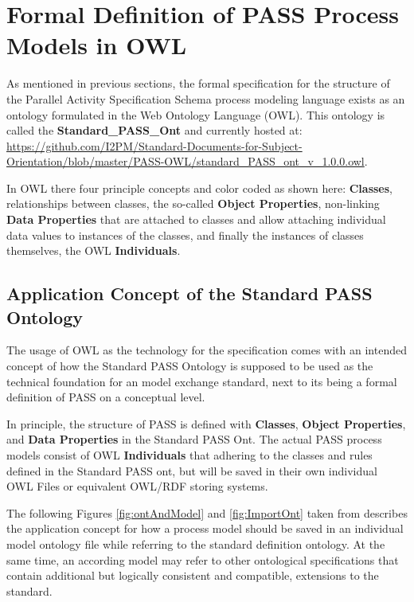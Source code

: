 \section{Formal Definition of PASS Process Models in OWL}
\label{sec:formalModelStrucutreOWL}

As mentioned in previous sections, the formal specification for the structure of the Parallel Activity Specification Schema process modeling language exists as an ontology formulated in the Web Ontology Language (OWL). This ontology is called the \textbf{Standard\_PASS\_Ont} and currently hosted at: 
\url{https://github.com/I2PM/Standard-Documents-for-Subject-Orientation/blob/master/PASS-OWL/standard_PASS\_ont\_v\_1.0.0.owl}.

In OWL there four principle concepts and color coded as shown here: \textcolor{OWLclass}{\textbf{Classes}}, relationships between classes, the so-called \textcolor{OWLObjectProperty}{\textbf{Object Properties}}, non-linking  \textcolor{OWLDataAttribute}{\textbf{Data Properties}} that are attached to classes and allow attaching individual data values to instances of the classes, and finally the instances of classes themselves, the OWL \textcolor{OWLIndividual}{\textbf{Individuals}}.



\subsection{Application Concept of the Standard PASS Ontology}

The usage of OWL as the technology for the specification comes with an intended concept of how the Standard PASS Ontology is supposed to be used as the technical foundation for an model exchange standard, next to its being a formal definition of PASS on a conceptual level.

In principle, the structure of PASS is defined with  \textcolor{OWLclass}{\textbf{Classes}},  \textcolor{OWLObjectProperty}{\textbf{Object Properties}}, and   \textcolor{OWLDataAttribute}{\textbf{Data Properties}} in the Standard PASS Ont. The actual PASS process models consist of OWL \textcolor{OWLIndividual}{\textbf{Individuals}} that adhering to the classes and rules defined in the Standard PASS ont, but will be saved in their own individual OWL Files or equivalent OWL/RDF storing systems.

The following Figures \ref{fig:ontAndModel} and \ref{fig:ImportOnt} taken from \cite{elster:ont} describes the application concept for how a process model should be saved in an individual model ontology file while referring to the standard definition ontology. At the same time, an according model may refer to other ontological specifications that contain additional but logically consistent and compatible, extensions to the standard.

